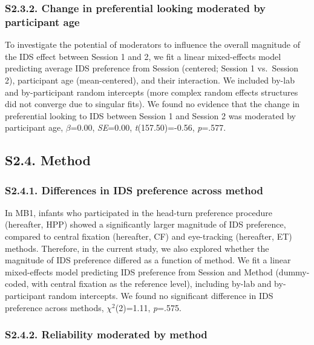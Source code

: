 \documentclass[
  man, donotrepeattitle,floatsintext]{apa6}
\begin{document}
\hypertarget{s2.3.2.-change-in-preferential-looking-moderated-by-participant-age}{%
\subsubsection{S2.3.2. Change in preferential looking moderated by participant age}\label{s2.3.2.-change-in-preferential-looking-moderated-by-participant-age}}

To investigate the potential of moderators to influence the overall magnitude of the IDS effect between Session 1 and 2, we fit a linear mixed-effects model predicting average IDS preference from Session (centered; Session 1 vs.~Session 2), participant age (mean-centered), and their interaction.
We included by-lab and by-participant random intercepts (more complex random effects structures did not converge due to singular fits).
We found no evidence that the change in preferential looking to IDS between Session 1 and Session 2 was moderated by participant age, \(\beta\)=0.00, \emph{SE}=0.00, \emph{t}(157.50)=-0.56, \emph{p}=.577.

\hypertarget{s2.4.-method}{%
\subsection{S2.4. Method}\label{s2.4.-method}}

\hypertarget{s2.4.1.-differences-in-ids-preference-across-method}{%
\subsubsection{S2.4.1. Differences in IDS preference across method}\label{s2.4.1.-differences-in-ids-preference-across-method}}

In MB1, infants who participated in the head-turn preference procedure (hereafter, HPP) showed a significantly larger magnitude of IDS preference, compared to central fixation (hereafter, CF) and eye-tracking (hereafter, ET) methods. Therefore, in the current study, we also explored whether the magnitude of IDS preference differed as a function of method. We fit a linear mixed-effects model predicting IDS preference from Session and Method (dummy-coded, with central fixation as the reference level), including by-lab and by-participant random intercepts. We found no significant difference in IDS preference across methods, \({\chi}^2\)(2)=1.11, \emph{p}=.575.

\hypertarget{s2.4.2.-reliability-moderated-by-method}{%
\subsubsection{S2.4.2. Reliability moderated by method}\label{s2.4.2.-reliability-moderated-by-method}}
\end{document}
